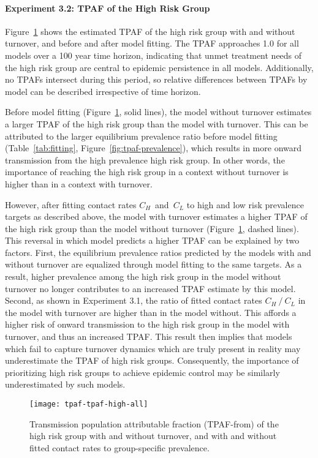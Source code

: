 \paragraph{Experiment 3.2: TPAF of the High Risk Group}
Figure~\ref{fig:tpaf} shows the estimated TPAF of the high risk group
with and without turnover, and before and after model fitting.
The TPAF approaches 1.0 for all models over a 100 year time horizon,
indicating that unmet treatment needs of the high risk group
are central to epidemic persistence in all models.
Additionally, no TPAFs intersect during this period,
so relative differences between TPAFs by model can be described irrespective of time horizon.
\par
Before model fitting (Figure~\ref{fig:tpaf}, solid lines),
the model without turnover estimates a larger TPAF of the high risk group
than the model with turnover.
This can be attributed to the larger equilibrium prevalence ratio before model fitting
(Table~\ref{tab:fitting}, Figure~\ref{fig:tpaf-prevalence}),
which results in more onward transmission from the high prevalence high risk group.
In other words, the importance of reaching the high risk group
in a context without turnover is higher than in a context with turnover.
\par
However, after fitting contact rates $C_H$~and~$C_L$ to
high and low risk prevalence targets as described above,
the model with turnover estimates a higher TPAF of the high risk group
than the model without turnover
(Figure~\ref{fig:tpaf}, dashed lines).
This reversal in which model predicts a higher TPAF can be explained by two factors.
First, the equilibrium prevalence ratios predicted by the models with and without turnover
are equalized through model fitting to the same targets.
As a result, higher prevalence among the high risk group in the model without turnover
no longer contributes to an increased TPAF estimate by this model.
Second, as shown in Experiment 3.1, 
the ratio of fitted contact rates $C_H~/~C_L$ in the model with turnover
are higher than in the model without.
This affords a higher risk of onward transmission to the high risk group
in the model with turnover, and thus an increased TPAF.
This result then implies that
models which fail to capture turnover dynamics which are truly present in reality
may underestimate the TPAF of high risk groups.
Consequently, the importance of prioritizing high risk groups
to achieve epidemic control may be similarly underestimated by such models.
\begin{figure}
  \centering
  \texttt{[image: tpaf-tpaf-high-all]}
  \caption{Transmission population attributable fraction (TPAF-from)
    of the high risk group with and without turnover,
    and with and without fitted contact rates to group-specific prevalence.}
  \label{fig:tpaf}
\end{figure}

